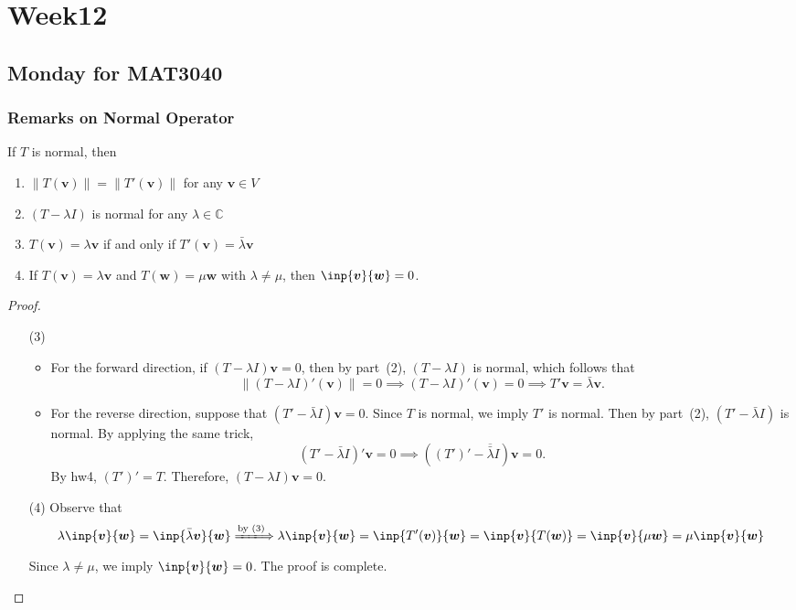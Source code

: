 \chapter{Week12}
\section{Monday for MAT3040}
\subsection{Remarks on Normal Operator}
\begin{proposition}\label{pro:12:1}
If $T$ is normal, then
\begin{enumerate}
\item
$\|T(\bm v)\| = \|T'(\bm v)\|$ for any $\bm v\in V$
\item
$(T-\lambda I)$ is normal for any $\lambda\in\mathbb{C}$
\item
$T(\bm v) = \lambda\bm v$ if and only if $T'(\bm v)=\bar{\lambda}\bm v$
\item
If $T(\bm v) = \lambda\bm v$ and $T(\bm w)=\mu\bm w$ with $\lambda\ne\mu$, then $\inp{\bm v}{\bm w}=0$.
\end{enumerate}
\end{proposition}

\begin{proof}
\begin{enumerate}
\item[(3)]
\begin{itemize}
\item
For the forward direction, if $(T-\lambda I)\bm v=0$, then by part~(2), $(T-\lambda I)$ is normal, which follows that 
\[
\|(T-\lambda I)'(\bm v)\|=0\implies
(T-\lambda I)'(\bm v)=0\implies 
T'\bm v = \bar{\lambda}\bm v.
\]
\item
For the reverse direction, suppose that $(T'-\bar{\lambda}I)\bm v=0$.
Since $T$ is normal, we imply $T'$ is normal.
Then by part~(2), $(T'-\bar{\lambda}I)$ is normal. 
By applying the same trick, 
\[
(T'-\bar{\lambda}I)'\bm v=0\implies
((T')' - \overline{\bar{\lambda}}I)\bm v=0.
\]
By hw4, $(T')' =T$. Therefore, 
$(T-\lambda I)\bm v=0$.
\end{itemize}
\item[(4)]
Observe that
\[\lambda
\inp{\bm v}{\bm w}=\inp{\bar{\lambda}\bm v}{\bm w}
\xLongrightarrow{\text{by (3)}}
\lambda
\inp{\bm v}{\bm w}
=
\inp{T'(\bm v)}{\bm w}=\inp{\bm v}{T(\bm w)}
=
\inp{\bm v}{\mu\bm w}=\mu \inp{\bm v}{\bm w}
\]
Since $\lambda\ne\mu$, we imply $\inp{\bm v}{\bm w}=0$.
The proof is complete.
\end{enumerate}
\end{proof}

